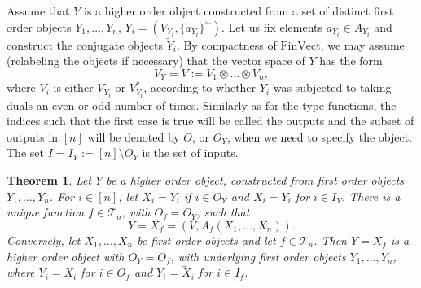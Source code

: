 \documentclass[12pt]{article}
\newtheorem{theorem}{Theorem}
\theoremstyle{definition}
\theoremstyle{remark}
\def\Te{\mathcal T}
\def \FV{\mathrm{FinVect}}
\begin{document}
Assume that  $Y$ is a higher order object constructed from a set of distinct first
order objects $Y_1,\dots, Y_n$, $Y_i=(V_{Y_i},\{\tilde a_{Y_i}\}^\sim)$.
Let us fix elements $a_{Y_i}\in A_{Y_i}$ and construct the conjugate objects $\tilde Y_i$. 
By compactness of $\FV$, we may assume (relabeling the objects if necessary) that the vector space of $Y$ has the form
\[
V_Y=V:=V_{1}\otimes \dots\otimes V_{n},
\]
where  $V_i$ is either $V_{Y_i}$ or $V_{Y_i}^*$, according to whether $Y_i$ was subjected
to taking duals an even or odd number of times. Similarly as for the type functions, the indices such that the first
case is true will be called the  outputs and the subset of outputs in $[n]$ will be denoted
by $O$, or $O_Y$, when we need to specify the object. The set $I=I_Y:=[n]\setminus O_Y$ is
the set of  inputs. 

\begin{theorem}\label{thm:boolean} Let $Y$ be a higher order object, constructed from first
order objects $Y_1,\dots,Y_n$. For $i\in [n]$, let 
$X_i=Y_i$ if $i\in O_Y$ and $X_i=\tilde Y_i$ for $i\in I_Y$. 
There is a unique function $f\in \Te_n$, with $O_f=O_Y$,  such that 
\[
Y= X_f=(V, A_f(X_1,\dots,X_n)).
\]
Conversely, let $X_1,\dots, X_n$  be first order objects  and let
$f\in \Te_n$. Then $Y=X_f$ is a higher order object with $O_Y=O_f$, with underlying first
order objects $Y_1,\dots, Y_n$, where $Y_i=X_i$ for $i\in O_f$ and $Y_i=\tilde X_i$ for
$i\in I_f$.  

\end{theorem}
\end{document}
